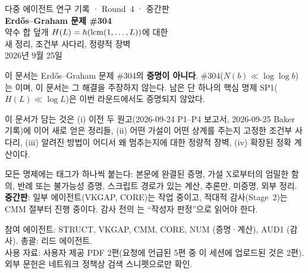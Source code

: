 \begin{titlepage}
\centering
{\large 다중 에이전트 연구 기록 · Round~4 · 중간판}\\[1.2cm]
{\Huge\bfseries Erdős--Graham 문제 \#304}\\[0.5cm]
{\LARGE 약수 합 덮개 $H(L)=h(\operatorname{lcm}(1,\dots,L))$에 대한}\\[0.2cm]
{\LARGE 새 정리, 조건부 사다리, 정량적 장벽}\\[1.2cm]
{\large 2026년 9월 25일}\\[1.5cm]
\begin{tcolorbox}[colback=red!4,colframe=red!60!black,width=0.92\textwidth,title={\bfseries 문서의 지위 (먼저 읽어 주십시오)}]
\small
이 문서는 Erdős--Graham 문제 \#304의 \textbf{증명이 아니다}. \#304($N(b)\ll\log\log b$)는 \OPEN{}이며, 이 문서는 그 해결을 주장하지 않는다. 남은 단 하나의 핵심 명제 SP1($H(L)\ll\log L$)은 이번 라운드에서도 증명되지 않았다.

이 문서가 담는 것은 (i) 이전 두 원고(2026-09-24 P1--P4 보고서, 2026-09-25 Baker 기록)에 이어 새로 얻은 정리들, (ii) 어떤 가설이 어떤 상계를 주는지 고정한 조건부 사다리, (iii) 알려진 방법이 어디서 왜 멈추는지에 대한 정량적 장벽, (iv) 확장된 정확 계산이다.

모든 명제에는 태그가 하나씩 붙는다: \PROVED{} 본문에 완결된 증명,  가설 X로부터의 엄밀한 함의, \REFUTED{} 반례 또는 불가능성 증명, \NUMERIC{} 스크립트 경로가 있는 계산, \HEUR{} 추론만, \OPEN{} 미증명, \EXT{} 외부 정리. \textbf{중간판}: 일부 에이전트(VKGAP, CORE)는 작업 중이고, 적대적 감사(Stage~2)는 CMM 절부터 진행 중이다. 감사 전의 \PROVED{}는 ``작성자 판정''으로 읽어야 한다.
\end{tcolorbox}
\vfill
{\small 참여 에이전트: STRUCT, VKGAP, CMM, CORE, NUM (증명·계산), AUD1 (감사). 총괄: 리드 에이전트.\\
사용 자료: 사용자 제공 PDF 2편(요청에 언급된 5편 중 이 세션에 업로드된 것은 2편). 외부 문헌은 네트워크 정책상 검색 스니펫으로만 확인.}
\end{titlepage}

\tableofcontents
\clearpage


